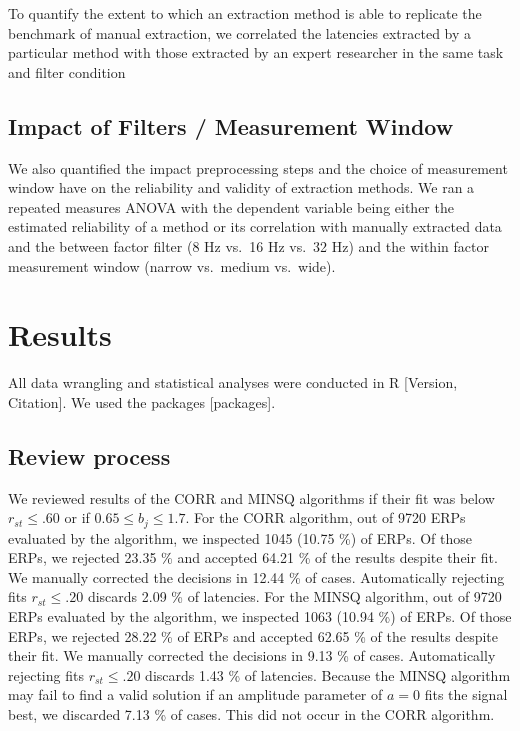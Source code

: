 \documentclass[
  man,floatsintext]{apa7}
\begin{document}
To quantify the extent to which an extraction method is able to replicate the benchmark of manual extraction, we correlated the latencies extracted by a particular method with those extracted by an expert researcher in the same task and filter condition

\hypertarget{impact-of-filters-measurement-window}{%
\subsection{Impact of Filters / Measurement Window}\label{impact-of-filters-measurement-window}}

We also quantified the impact preprocessing steps and the choice of measurement window have on the reliability and validity of extraction methods. We ran a repeated measures ANOVA with the dependent variable being either the estimated reliability of a method or its correlation with manually extracted data and the between factor filter (8 Hz vs.~16 Hz vs.~32 Hz) and the within factor measurement window (narrow vs.~medium vs.~wide).

\hypertarget{results}{%
\section{Results}\label{results}}

All data wrangling and statistical analyses were conducted in R {[}Version, Citation{]}. We used the packages {[}packages{]}.

\hypertarget{review-process}{%
\subsection{Review process}\label{review-process}}

We reviewed results of the CORR and MINSQ algorithms if their fit was below \(r_{st} \le .60\) or if \(0.65 \le b_j \le 1.7\). For the CORR algorithm, out of 9720 ERPs evaluated by the algorithm, we inspected 1045 (10.75 \%) of ERPs. Of those ERPs, we rejected 23.35 \% and accepted 64.21 \% of the results despite their fit. We manually corrected the decisions in 12.44 \% of cases. Automatically rejecting fits \(r_{st} \le .20\) discards 2.09 \% of latencies. For the MINSQ algorithm, out of 9720 ERPs evaluated by the algorithm, we inspected 1063 (10.94 \%) of ERPs. Of those ERPs, we rejected 28.22 \% of ERPs and accepted 62.65 \% of the results despite their fit. We manually corrected the decisions in 9.13 \% of cases. Automatically rejecting fits \(r_{st} \le .20\) discards 1.43 \% of latencies. Because the MINSQ algorithm may fail to find a valid solution if an amplitude parameter of \(a = 0\) fits the signal best, we discarded 7.13 \% of cases. This did not occur in the CORR algorithm.
\end{document}
